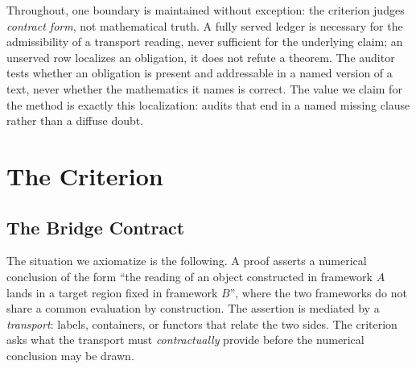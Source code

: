 \documentclass[11pt,a4paper]{article}
\begin{document}
Throughout, one boundary is maintained without exception: the criterion
judges \emph{contract form}, not mathematical truth. A fully served ledger
is necessary for the admissibility of a transport reading, never sufficient
for the underlying claim; an unserved row localizes an obligation, it does
not refute a theorem. The auditor tests whether an obligation is present
and addressable in a named version of a text, never whether the mathematics
it names is correct. The value we claim for the method is exactly this
localization: audits that end in a named missing clause rather than a
diffuse doubt.

\section{The Criterion}\label{sec:criterion}

\subsection{The Bridge Contract}\label{sec:contract}

The situation we axiomatize is the following. A proof asserts a numerical
conclusion of the form ``the reading of an object constructed in framework $A$
lands in a target region fixed in framework $B$'', where the two frameworks do
not share a common evaluation by construction. The assertion is mediated by a
\emph{transport}: labels, containers, or functors that relate the two sides.
The criterion asks what the transport must \emph{contractually} provide before
the numerical conclusion may be drawn.
\end{document}
